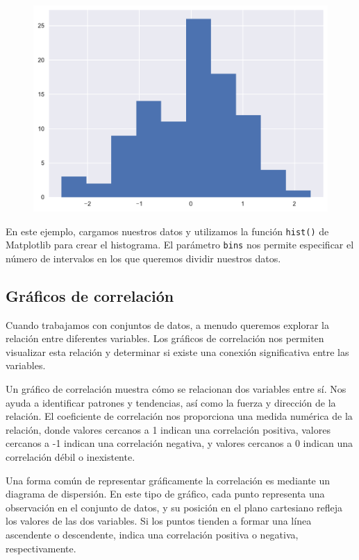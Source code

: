 \documentclass[
  a4paper,
]{article}
\begin{document}
\begin{figure}[H]

{\centering \includegraphics{index_files/figure-pdf/cell-27-output-1.pdf}

}

\end{figure}

En este ejemplo, cargamos nuestros datos y utilizamos la función
\texttt{hist()} de Matplotlib para crear el histograma. El parámetro
\texttt{bins} nos permite especificar el número de intervalos en los que
queremos dividir nuestros datos.

\hypertarget{gruxe1ficos-de-correlaciuxf3n}{%
\subsection{Gráficos de
correlación}\label{gruxe1ficos-de-correlaciuxf3n}}

Cuando trabajamos con conjuntos de datos, a menudo queremos explorar la
relación entre diferentes variables. Los gráficos de correlación nos
permiten visualizar esta relación y determinar si existe una conexión
significativa entre las variables.

Un gráfico de correlación muestra cómo se relacionan dos variables entre
sí. Nos ayuda a identificar patrones y tendencias, así como la fuerza y
dirección de la relación. El coeficiente de correlación nos proporciona
una medida numérica de la relación, donde valores cercanos a 1 indican
una correlación positiva, valores cercanos a -1 indican una correlación
negativa, y valores cercanos a 0 indican una correlación débil o
inexistente.

Una forma común de representar gráficamente la correlación es mediante
un diagrama de dispersión. En este tipo de gráfico, cada punto
representa una observación en el conjunto de datos, y su posición en el
plano cartesiano refleja los valores de las dos variables. Si los puntos
tienden a formar una línea ascendente o descendente, indica una
correlación positiva o negativa, respectivamente.
\end{document}
